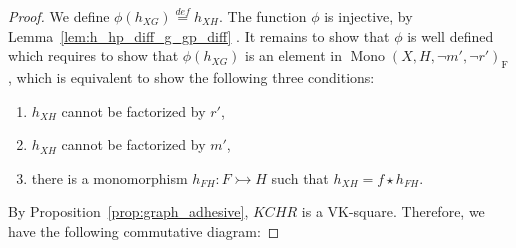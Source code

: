 \begin{proof}
       
        We define $\phi(h_{XG}) \overset{def}{=} h_{XH}$. The function $\phi$ is injective, by Lemma~\ref{lem:h_hp_diff_g_gp_diff} . It remains to show that $\phi$ is well defined which requires to show that $\phi(h_{XG})$ is an element in $\operatorname{Mono}(X,H,\lnot m', \lnot r')_{\operatorname{F}}$, which is equivalent to show the following three conditions:
        \begin{enumerate}
            \item $h_{XH}$ cannot be factorized by $r'$,
            \item $h_{XH}$ cannot be factorized by $m'$,
            \item there is a monomorphism $h_{FH}:F \rightarrowtail H$ such that $h_{XH} \mathop{=} f \mathop{\star} h_{FH}$.
        \end{enumerate}

        By Proposition~\ref{prop:graph_adhesive}, $KCHR$ is a VK-square. Therefore, we have the following commutative diagram:


\end{proof}
